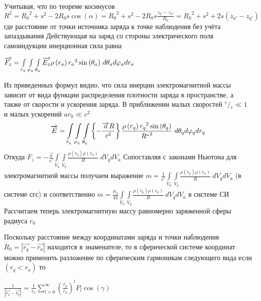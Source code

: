 \documentclass{article}
\begin{document}
Учитывая, что по теореме косинусов
${{R}^{2}}={{R}_{0}}^{2}+{{s}^{2}}-2{{R}_{0}}s\cos \left( \alpha  \right)={{R}_{0}}^{2}+{{s}^{2}}-2{{R}_{0}}s\frac{{{z}_{q'}}-{{z}_{a'}}}{{{R}_{0}}}={{R}_{0}}^{2}+{{s}^{2}}+2s\left( {{z}_{a'}}-{{z}_{q'}} \right)$
где  расстояние от точки источника заряда к точке наблюдения без учёта запаздывания
Действующая на заряд со стороны электрического поля самоиндукции инерционная сила равна

$\overrightarrow{{{F}_{z}}}=\int\limits_{{{r}_{a}}}\int\limits_{{{\varphi}_{a}}}\int\limits_{{{\theta}_{a}}}\\
{\overrightarrow{{{E}_{z}}}\rho \left( {{r}_{a}} \right){{r}_{a}}^{2}\sin \left( {{\theta }_{a}} \right)}\ d{{\theta }_{a}}d{{\varphi }_{a}}d{{r}_{a}}$


Из приведенных формул видно, что сила инерции электромагнитной массы зависит от вида функции распределения плотности заряда в пространстве, а также от скорости и ускорения заряда.
В приближении малых скоростей ${}^{v}/{}_{c}\ll 1$  и малых ускорений $a{{r}_{0}}\ll {{c}^{2}}$
\[\overrightarrow{E}=\int\limits_{{{r}_{q}}}\int\limits_{{{\varphi}_{q}}}\int\limits_{{{\theta}_{q}}}\\
{\left\{ -\frac{\overrightarrow{a}R}{{{c}^{2}}} \right\}\frac{\rho \left( {{r}_{q}} \right){{r}_{q}}^{2}\sin \left( {{\theta }_{q}} \right)}{{{R}^{*}}^{2}}\ }d{{\theta }_{q}}d{{\varphi }_{q}}d{{r}_{q}}\]
Откуда
${{F}_{z}}=-\frac{\overrightarrow{a}}{{{c}^{^{2}}}}\int\limits_{{{V}_{a}}}{\int\limits_{{{V}_{q}}}{\frac{\rho \left( {{r}_{q}} \right)\rho \left( {{r}_{a}} \right)}{R}}}\ d{{V}_{q}}d{{V}_{a}}$
Сопоставляя с законами Ньютона для электромагнитной массы получаем выражение
$m=\frac{1}{{{c}^{^{2}}}}\int\limits_{{{V}_{a}}}{\int\limits_{{{V}_{q}}}{\frac{\rho \left( {{r}_{q}} \right)\rho \left( {{r}_{a}} \right)}{R}}}\ d{{V}_{q}}d{{V}_{a}}$ (в системе сгс) и соответственно $m=\frac{{{\mu }_{0}}}{4\pi }\int\limits_{{{V}_{a}}}{\int\limits_{{{V}_{q}}}{\frac{\rho \left( {{r}_{q}} \right)\rho \left( {{r}_{a}} \right)}{R}}}\ d{{V}_{q}}d{{V}_{a}}$ в системе СИ
Рассчитаем теперь электромагнитную массу равномерно заряженной сферы радиуса ${{r}_{0}}$

Поскольку расстояние между координатами заряда и точки наблюдения ${{R}_{0}}=\left|\overrightarrow{r_{q}} - \overrightarrow{r_{a}}\right|$ находится в знаменателе, то в сферической системе координат можно применить разложение по сферическим гармоникам следующего вида  \cite{flugge} если $\left( {{r}_{q}}<{{r}_{a}} \right)$ то

$\frac{1}{\left| \overrightarrow{{{r}_{q}}}-\overrightarrow{{{r}_{a}}} \right|}=\frac{1}{{{r}_{a}}}\sum\limits_{l=0}^{\infty }{{{\left( \frac{{{r}_{q}}}{{{r}_{a}}} \right)}^{l}}{{P}_{l}} \cos \left( \gamma  \right)}$
\end{document}
